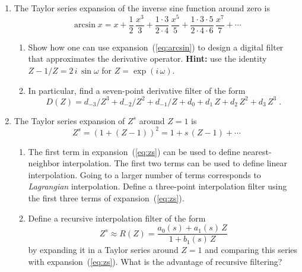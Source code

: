 \begin{enumerate}

\item The Taylor series expansion of the inverse sine function around zero is
\begin{equation}
  \label{eq:arcsin}
  \arcsin{x} = x + \frac{1}{2}\,\frac{x^3}{3} + 
  \frac{1 \cdot 3}{2 \cdot 4}\,\frac{x^5}{5} + 
  \frac{1 \cdot 3 \cdot 5}{2 \cdot 4 \cdot 6}\,\frac{x^7}{7} + 
  \cdots
\end{equation}
\begin{enumerate}
\item Show how one can use expansion~(\ref{eq:arcsin}) to design a
  digital filter that approximates the derivative
  operator. \textbf{Hint:} use the identity $Z-1/Z =
  2\,i\,\sin{\omega}$ for $Z = \exp{(i\,\omega)}$.
\item In particular, find a seven-point derivative filter of the form
\begin{equation}
  \label{eq:d6}
  D(Z) = d_{-3}/Z^{3} + d_{-2}/Z^{2} + d_{-1}/Z + d_0 + 
  d_1\,Z + d_2\,Z^2 + d_3\,Z^3\;.
\end{equation}
\end{enumerate}

\item The Taylor series expansion of $Z^s$ around $Z=1$ is
\begin{equation}
  \label{eq:zs}
  Z^s = \left(1+(Z-1)\right)^2 = 1 + s\,(Z-1) + \cdots  
\end{equation}
\begin{enumerate}
\item The first term in expansion~(\ref{eq:zs}) can be used to
  define nearest-neighbor interpolation. The first two terms can be
  used to define linear interpolation. Going to a larger number of
  terms corresponds to \emph{Lagrangian} interpolation. Define a
  three-point interpolation filter using the first three terms of
  expansion~(\ref{eq:zs}).
\item Define a recursive interpolation filter of the form
\begin{equation}
  \label{eq:rec}
  Z^s \approx R(Z) = \frac{a_0(s) + a_1(s)\,Z}{1 + b_1(s)\,Z}
\end{equation}
by expanding it in a Taylor series around $Z=1$ and comparing this
series with expansion~(\ref{eq:zs}). What is the advantage of
recursive filtering?
\end{enumerate}


\end{enumerate}
